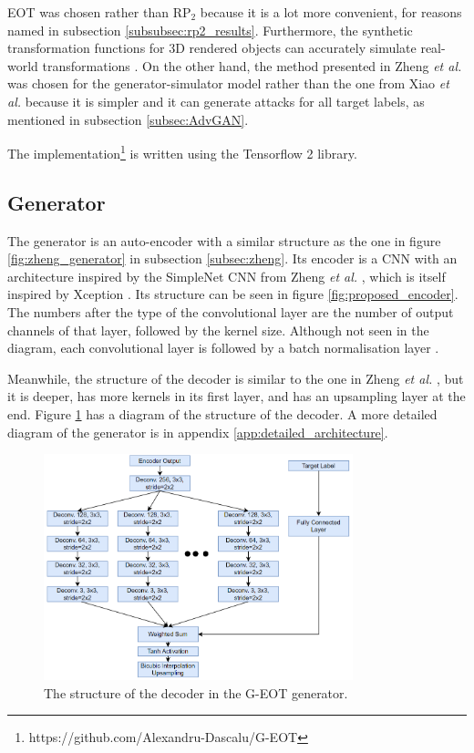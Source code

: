 EOT \cite{athalye} was chosen rather than $\textrm{RP}_2$ \cite{evtimov_road_signs} because it is a lot more convenient, for reasons named in subsection \ref{subsubsec:rp2_results}. Furthermore, the synthetic transformation functions for 3D rendered objects can accurately simulate real-world transformations \cite{athalye}. On the other hand, the method presented in Zheng \textit{et al.} \cite{zheng_black_box_GAN} was chosen for the generator-simulator model rather than the one from Xiao \textit{et al.} \cite{advGAN} because it is simpler and it can generate attacks for all target labels, as mentioned in subsection \ref{subsec:AdvGAN}.

The implementation\footnote{https://github.com/Alexandru-Dascalu/G-EOT} is written using the Tensorflow 2 library.

\subsection{Generator}
    \label{subsec:g_eot_generator}

The generator is an auto-encoder with a similar structure as the one in figure \ref{fig:zheng_generator} in subsection \ref{subsec:zheng}. Its encoder is a CNN with an architecture inspired by the SimpleNet CNN from Zheng \textit{et al.} \cite{zheng_black_box_GAN}, which is itself inspired by Xception \cite{xception}.  Its structure can be seen in figure \ref{fig:proposed_encoder}. The numbers after the type of the convolutional layer are the number of output channels of that layer, followed by the kernel size. Although not seen in the diagram, each convolutional layer is followed by a batch normalisation layer \cite{batch_norm}.

Meanwhile, the structure of the decoder is similar to the one in Zheng \textit{et al.} \cite{zheng_black_box_GAN}, but it is deeper, has more kernels in its first layer, and has an upsampling layer at the end. Figure \ref{fig:proposed_decoder} has a diagram of the structure of the decoder. A more detailed diagram of the generator is in appendix \ref{app:detailed_architecture}.

\begin{figure}[ht]
    \centering
    \includegraphics[width=0.8\textwidth]{graphics/g_eot_decoder.PNG}
    \caption{The structure of the decoder in the G-EOT generator.}
    \label{fig:proposed_decoder}
\end{figure}

